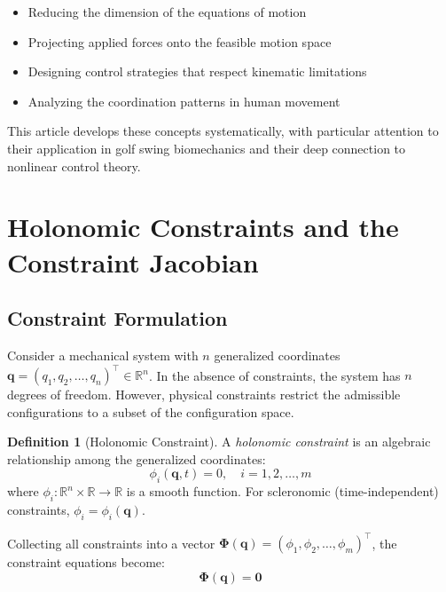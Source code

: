 \documentclass[11pt,a4paper]{article}
\theoremstyle{definition}
\newtheorem{definition}{Definition}[section]
\newcommand{\R}{\mathbb{R}}
\newcommand{\qvec}{\bm{q}}
\newcommand{\Phivec}{\bm{\Phi}}
\begin{document}
\begin{itemize}[noitemsep]
    \item Reducing the dimension of the equations of motion
    \item Projecting applied forces onto the feasible motion space
    \item Designing control strategies that respect kinematic limitations
    \item Analyzing the coordination patterns in human movement
\end{itemize}

This article develops these concepts systematically, with particular attention to their application in golf swing biomechanics and their deep connection to nonlinear control theory.

\section{Holonomic Constraints and the Constraint Jacobian}

\subsection{Constraint Formulation}

Consider a mechanical system with $n$ generalized coordinates $\qvec = (q_1, q_2, \ldots, q_n)^\top \in \R^n$. In the absence of constraints, the system has $n$ degrees of freedom. However, physical constraints restrict the admissible configurations to a subset of the configuration space.

\begin{definition}[Holonomic Constraint]
A \emph{holonomic constraint} is an algebraic relationship among the generalized coordinates:
\begin{equation}
    \phi_i(\qvec, t) = 0, \quad i = 1, 2, \ldots, m
\end{equation}
where $\phi_i: \R^n \times \R \to \R$ is a smooth function. For scleronomic (time-independent) constraints, $\phi_i = \phi_i(\qvec)$.
\end{definition}

Collecting all constraints into a vector $\Phivec(\qvec) = (\phi_1, \phi_2, \ldots, \phi_m)^\top$, the constraint equations become:
\begin{equation}
    \boxed{\Phivec(\qvec) = \bm{0}}
\end{equation}
\end{document}
